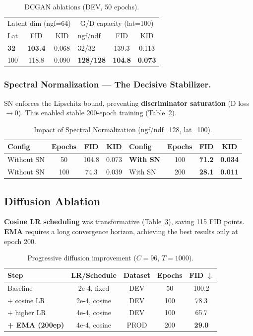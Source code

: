 \documentclass[runningheads]{llncs}
\begin{document}
\begin{table}[htbp]
\caption{DCGAN ablations (DEV, 50 epochs).}\label{tab:dcgan_ablation}
\centering\small
\begin{tabular}{lcc|lcc}
\toprule
\multicolumn{3}{c|}{Latent dim (ngf=64)} & \multicolumn{3}{c}{G/D capacity (lat=100)} \\
Lat & FID & KID & ngf/ndf & FID & KID \\
\midrule
\textbf{32} & \textbf{103.4} & 0.068 & 32/32 & 139.3 & 0.113 \\
100 & 118.8 & 0.090 & \textbf{128/128} & \textbf{104.8} & \textbf{0.073} \\
\bottomrule
\end{tabular}
\end{table}

\subsubsection{Spectral Normalization --- The Decisive Stabilizer.}
SN enforces the Lipschitz bound, preventing \textbf{discriminator saturation} (D loss $\to 0$). This enabled stable 200-epoch training (Table~\ref{tab:dcgan_sn}).
\begin{table}[htbp]
\caption{Impact of Spectral Normalization (ngf/ndf=128, lat=100).}\label{tab:dcgan_sn}
\centering\small
\begin{tabular}{lccc|lccc}
\toprule
Config & Epochs & FID & KID & Config & Epochs & FID & KID \\
\midrule
Without SN & 50  & 104.8 & 0.073 & \textbf{With SN} & 100 & \textbf{71.2} & \textbf{0.034} \\
Without SN & 100 & 74.3  & 0.039 & With SN & 200 & \textbf{28.1} & \textbf{0.011} \\
\bottomrule
\end{tabular}
\end{table}

\subsection{Diffusion Ablation}\label{sec:diff_ablation}

\textbf{Cosine LR scheduling} was transformative (Table~\ref{tab:diff_path}), saving 115 FID points. \textbf{EMA} requires a long convergence horizon, achieving the best results only at epoch 200.
\begin{table}[htbp]
\caption{Progressive diffusion improvement ($C=96$, $T=1000$).}\label{tab:diff_path}
\centering\small
\begin{tabular}{lcccc}
\toprule
Step & LR/Schedule & Dataset & Epochs & FID $\downarrow$ \\
\midrule
Baseline & 2e-4, fixed & DEV & 50 & 100.2 \\
+ cosine LR & 2e-4, cosine & DEV & 100 & 78.3 \\
+ higher LR & 4e-4, cosine & DEV & 100 & 65.7 \\
\textbf{+ EMA (200ep)} & 4e-4, cosine & PROD & 200 & \textbf{29.0} \\
\bottomrule
\end{tabular}
\end{table}
\end{document}
